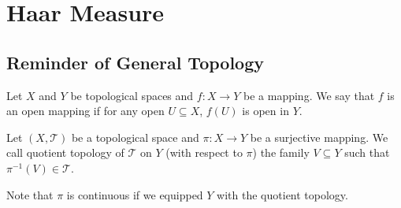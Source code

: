 \chapter{Haar Measure}

\section{Reminder of General Topology}

\begin{definitionenv}\label{def:IsOpenMap}
    Let $X$ and $Y$ be topological spaces and $f: X\rightarrow Y$ be a mapping.
    We say that $f$ is an open mapping if for any open $U \subseteq X$, $f(U)$ is open in $Y$.
\end{definitionenv}

\begin{definitionenv} %
    Let $(X,\mathscr{T})$ be a topological space and $\pi : X\rightarrow Y$ be a surjective mapping.
    We call quotient topology of $\mathscr{T}$ on $Y$ (with respect to $\pi$) the family $V\subseteq Y$ such that 
    $\pi^{-1}(V) \in \mathscr{T}$.

    \quad Note that $\pi$ is continuous if we equipped $Y$ with the quotient topology.
\end{definitionenv}

